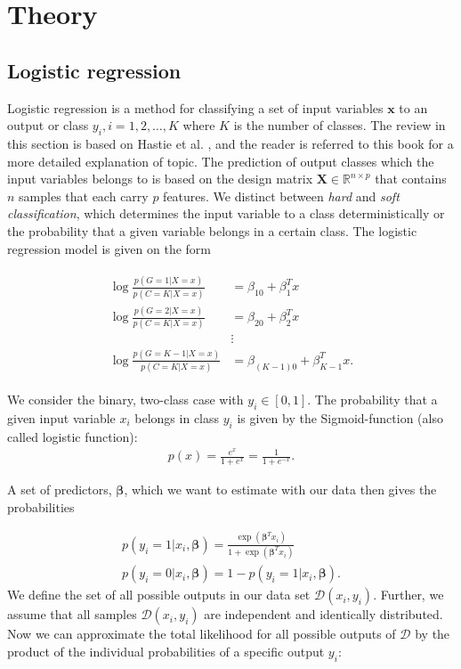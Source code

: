 \documentclass[../main.tex]{subfiles}
\begin{document}
\section{Theory}
\subsection{Logistic regression}
Logistic regression is a method for classifying a set of input variables \ensuremath{\boldsymbol{x}} to an output or class \ensuremath{y_i, i=1,2, \ldots,K} where $K$ is the number of classes. The review in this section is based on Hastie et al. \cite[ch.~4]{HastieTrevor2009EoSL},  and the reader is referred to this book for a more detailed explanation of topic. The prediction of output classes which the input variables belongs to is based on the design matrix \ensuremath{\boldsymbol{X}\in\mathbb{R}^{n\times p}} that contains $n$ samples that each carry $p$ features. We distinct between \textit{hard} and \textit{soft classification}, which determines the input variable to a class deterministically or the probability that a given variable belongs in a certain class. The logistic regression model is given on the form
 
\begin{align}
    \begin{split}
        \log\frac{p(G=1|X=x)}{p(C=K|X=x)}&=\beta_{10}+\beta_1^Tx \\
        \log\frac{p(G=2|X=x)}{p(C=K|X=x)}&=\beta_{20}+\beta_2^Tx \\
        &\vdots\\ 
        \log\frac{p(G=K-1|X=x)}{p(C=K|X=x)}&=\beta_{(K-1)0}+\beta_{K-1}^Tx.
    \end{split}
\end{align}

We consider the binary, two-class case with \ensuremath{y_i \in [0,1]}. The probability that a given input variable $x_i$ belongs in class $y_i$ is given by the Sigmoid-function (also called logistic function):
\begin{align}
    p(x) = \frac{e^x}{1+e^x}=\frac{1}{1+e^{-x}}.
    \label{eq:sigmoid}
\end{align}

A set of predictors, \ensuremath{\boldsymbol{\beta}}, which we want to estimate with our data then gives the probabilities 

\begin{align}
    p(y_i=1|x_i,\boldsymbol{\beta})=\frac{\exp\left(\boldsymbol{\beta}^Tx_i\right)}{1+\exp\left(\boldsymbol{\beta}^Tx_i\right)} \\
    p(y_i=0|x_i,\boldsymbol{\beta})=1-p(y_i=1|x_i,\boldsymbol{\beta}).
\end{align} We define the set of all possible outputs in our data set \ensuremath{\mathcal{D}(x_i,y_i)}. Further, we assume that all samples \ensuremath{\mathcal{D}(x_i,y_i)} are independent and identically distributed. Now we can approximate the total likelihood for all possible outputs of \ensuremath{\mathcal{D}} by the product of the individual probabilities \cite[p.~120]{HastieTrevor2009EoSL} of a specific output $y_i$:
\end{document}
